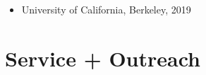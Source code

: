 \documentclass[letterpaper]{deedy-resume} %
\begin{document}
\begin{itemize}
\item {{} University of California, Berkeley, 2019}


\end{itemize}



\section{Service + Outreach}

\vspace{0.2cm}

\end{document}
